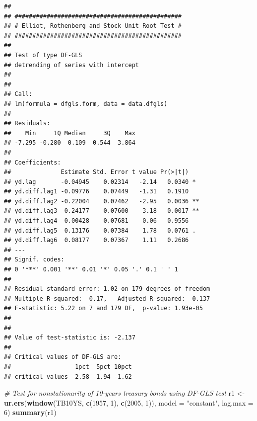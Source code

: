 \documentclass[]{book}
\newenvironment{Shaded}{\begin{snugshade}}{\end{snugshade}}
\newcommand{\CommentTok}[1]{\textcolor[rgb]{0.56,0.35,0.01}{\textit{#1}}}
\newcommand{\DataTypeTok}[1]{\textcolor[rgb]{0.13,0.29,0.53}{#1}}
\newcommand{\DecValTok}[1]{\textcolor[rgb]{0.00,0.00,0.81}{#1}}
\newcommand{\KeywordTok}[1]{\textcolor[rgb]{0.13,0.29,0.53}{\textbf{#1}}}
\newcommand{\NormalTok}[1]{#1}
\newcommand{\StringTok}[1]{\textcolor[rgb]{0.31,0.60,0.02}{#1}}
\begin{document}
\begin{verbatim}
## 
## ############################################### 
## # Elliot, Rothenberg and Stock Unit Root Test # 
## ############################################### 
## 
## Test of type DF-GLS 
## detrending of series with intercept 
## 
## 
## Call:
## lm(formula = dfgls.form, data = data.dfgls)
## 
## Residuals:
##    Min     1Q Median     3Q    Max 
## -7.295 -0.280  0.109  0.544  3.864 
## 
## Coefficients:
##              Estimate Std. Error t value Pr(>|t|)   
## yd.lag       -0.04945    0.02314   -2.14   0.0340 * 
## yd.diff.lag1 -0.09776    0.07449   -1.31   0.1910   
## yd.diff.lag2 -0.22004    0.07462   -2.95   0.0036 **
## yd.diff.lag3  0.24177    0.07600    3.18   0.0017 **
## yd.diff.lag4  0.00428    0.07681    0.06   0.9556   
## yd.diff.lag5  0.13176    0.07384    1.78   0.0761 . 
## yd.diff.lag6  0.08177    0.07367    1.11   0.2686   
## ---
## Signif. codes:  
## 0 '***' 0.001 '**' 0.01 '*' 0.05 '.' 0.1 ' ' 1
## 
## Residual standard error: 1.02 on 179 degrees of freedom
## Multiple R-squared:  0.17,   Adjusted R-squared:  0.137 
## F-statistic: 5.22 on 7 and 179 DF,  p-value: 1.93e-05
## 
## 
## Value of test-statistic is: -2.137 
## 
## Critical values of DF-GLS are:
##                  1pct  5pct 10pct
## critical values -2.58 -1.94 -1.62
\end{verbatim}

\begin{Shaded}
\begin{Highlighting}[]
\CommentTok{# Test for nonstationarity of 10-years treasury bonds using DF-GLS test}
\NormalTok{r1 <-}\StringTok{ }\KeywordTok{ur.ers}\NormalTok{(}\KeywordTok{window}\NormalTok{(TB10YS, }\KeywordTok{c}\NormalTok{(}\DecValTok{1957}\NormalTok{, }\DecValTok{1}\NormalTok{), }\KeywordTok{c}\NormalTok{(}\DecValTok{2005}\NormalTok{, }\DecValTok{1}\NormalTok{)),}
             \DataTypeTok{model =} \StringTok{"constant"}\NormalTok{, }
             \DataTypeTok{lag.max =} \DecValTok{6}\NormalTok{)}
\KeywordTok{summary}\NormalTok{(r1)}
\end{Highlighting}
\end{Shaded}
\end{document}
